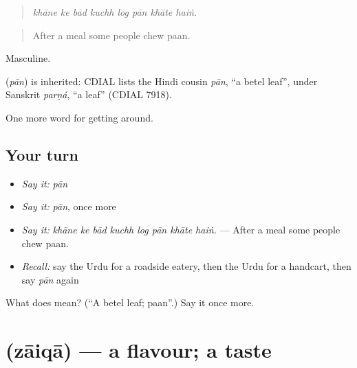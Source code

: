 \begin{quote}
       
\end{quote}

\begin{quote}
\emph{khāne ke bād kuchh log pān khāte haiṅ.}
\end{quote}

\begin{quote}
After a meal some people chew paan.
\end{quote}

Masculine.

\begin{cousinweb}
\textbf{} (\emph{pān}) is inherited: CDIAL lists the Hindi cousin \emph{pān}, \textquotedblleft{}a betel leaf\textquotedblright{}, under Sanskrit \emph{parṇá}, \textquotedblleft{}a leaf\textquotedblright{} (CDIAL 7918).
\end{cousinweb}

\begin{grammarlens}[title={What you've built}]
One more word for getting around.
\end{grammarlens}

\subsection*{Your turn}
\begin{itemize}
\raggedright
  \item \emph{Say it:} \emph{pān}
  \item \emph{Say it:} \emph{pān}, once more
  \item \emph{Say it:} \emph{khāne ke bād kuchh log pān khāte haiṅ.} — After a meal some people chew paan.
  \item \emph{Recall:} say the Urdu for a roadside eatery, then the Urdu for a handcart, then say \emph{pān} again
\end{itemize}

\begin{tcolorbox}[breakable,colback=teal!4,colframe=teal!35!black,title={Before you move on}]
What does  mean? (\textquotedblleft{}A betel leaf; paan\textquotedblright{}.) Say it once more.
\end{tcolorbox}
\section[\texorpdfstring{\ur{ذائقہ} (zāiqā)}{ذائقہ (zāiqā)}]{ (zāiqā) — a flavour; a taste}

